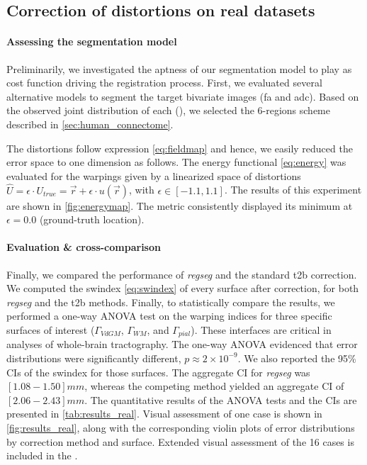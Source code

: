 \subsection{Correction of distortions on real datasets}\label{sec:results_hcp}

\paragraph*{Assessing the segmentation model}\label{sec:res_model_and_metric} %
%
Preliminarily, we investigated the aptness of our segmentation model to play as cost function
  driving the registration process.
First, we evaluated several alternative models to segment the target bivariate images
  (\gls*{fa} and \gls*{adc}).
Based on the observed joint distribution of each (),
  we selected the 6-regions scheme described in \autoref{sec:human_connectome}.

The distortions follow expression \eqref{eq:fieldmap} and hence, we easily reduced the
  error space to one dimension as follows.
The energy functional \eqref{eq:energy} was evaluated for the warpings given by
  a linearized space of distortions
  $\hat{U} = \epsilon \cdot U_{true} = \vec{r} + \epsilon \cdot u(\vec{r})$,
  with $\epsilon \in [-1.1, 1.1]$.
The results of this experiment are shown in \autoref{fig:energymap}.
The metric consistently displayed its minimum at $\epsilon=0.0$ (ground-truth location).


\paragraph*{Evaluation \& cross-comparison}\label{sec:res_cc_evaluation}
%
Finally, we compared the performance of \emph{regseg} and the standard \gls*{t2b}
  correction.
We computed the \gls*{swindex} \eqref{eq:swindex} of every surface after correction,
  for both \emph{regseg} and the \gls*{t2b} methods.
Finally, to statistically compare the results, we performed a one-way ANOVA test
  on the warping indices for three specific surfaces of interest
  ($\Gamma_{VdGM}$, $\Gamma_{WM}$, and $\Gamma_{pial}$).
These interfaces are critical in analyses of whole-brain tractography.
The one-way ANOVA evidenced that error distributions were significantly different,
  $p \approx 2 \times 10^{-9}$.
We also reported the 95\% CIs of the \gls*{swindex} for those surfaces.
The aggregate CI for \emph{regseg} was $[1.08 - 1.50] mm$, whereas the competing method
  yielded an aggregate CI of $[2.06 - 2.43] mm$.
The quantitative results of the ANOVA tests and the CIs are presented in \autoref{tab:results_real}.
Visual assessment of one case is shown in \autoref{fig:results_real}, along with the corresponding
  violin plots of error distributions by correction method and surface.
Extended visual assessment of the 16 cases is included in the .

